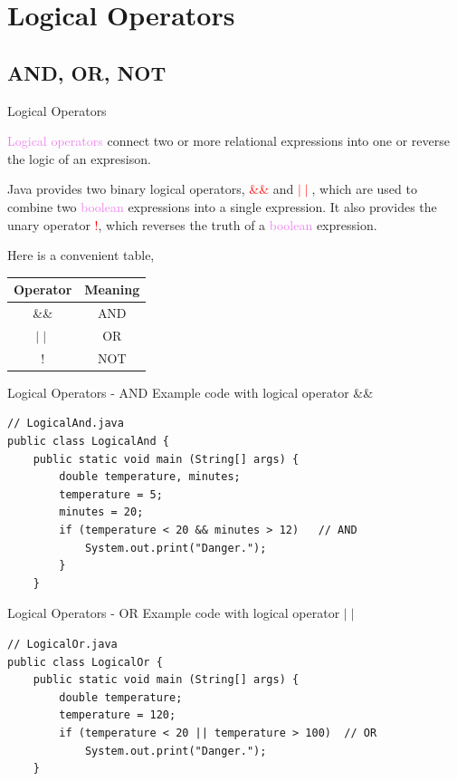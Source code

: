 \documentclass[11pt]{beamer}
\newcommand{\red}[1]{\textcolor{red}{#1}}
\newcommand{\violet}[1]{\textcolor{violet}{#1}}
\begin{document}
\section{Logical Operators}
\subsection{AND, OR, NOT}
\begin{frame}{Logical Operators}
    \begin{center}
        \violet{Logical operators} connect two or more relational expressions into one or reverse the logic of an expresison.
    \end{center}
    Java provides two binary logical operators, \red{\&\&} and \red{$\mid \mid$}, which are used to combine two \violet{boolean} expressions into a single expression. It also provides the unary operator \red{!}, which reverses the truth of a \violet{boolean} expression.
    \vspace{1em}

    Here is a convenient table,
    \begin{table}[]
    \begin{tabular}{|c|c|}
    \hline
    Operator & Meaning \\ \hline
    \&\&     & AND     \\ \hline
    $\mid \mid$        & OR      \\ \hline
    !        & NOT     \\ \hline
    \end{tabular}
    \end{table}
\end{frame}

\begin{frame}[fragile]{Logical Operators - AND}
    Example code with logical operator \&\& 
    \begin{lstlisting}
// LogicalAnd.java
public class LogicalAnd {
    public static void main (String[] args) {
        double temperature, minutes;
        temperature = 5;
        minutes = 20;
        if (temperature < 20 && minutes > 12)	// AND
            System.out.print("Danger.");
        }
    }
    \end{lstlisting}
\end{frame}

\begin{frame}[fragile]{Logical Operators - OR}
    Example code with logical operator $\mid \mid$
    \begin{lstlisting}
// LogicalOr.java
public class LogicalOr {
    public static void main (String[] args) {
        double temperature;
        temperature = 120;
        if (temperature < 20 || temperature > 100)	// OR
            System.out.print("Danger.");
    }
    \end{lstlisting}
\end{frame}
\end{document}
